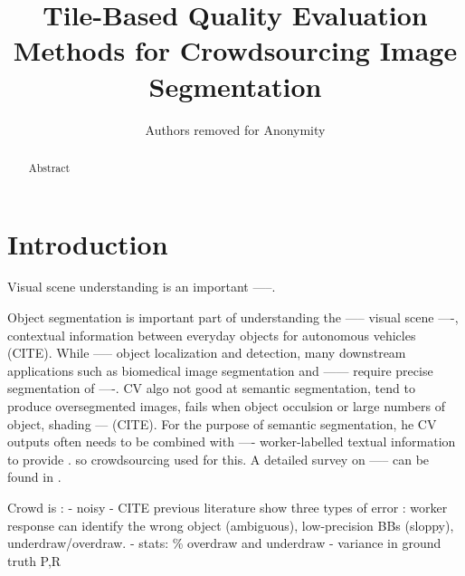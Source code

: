\documentclass[letterpaper]{article} %
\begin{document}

%
\title{Tile-Based Quality Evaluation Methods for Crowdsourcing Image Segmentation}
\author{Authors removed for Anonymity}
\maketitle
\begin{abstract}
Abstract
\end{abstract}

\section{Introduction}
Visual scene understanding is an important -----. 
\par Object segmentation is important part of understanding the ----- visual scene \cite{Lin2014} ----, contextual information between everyday objects for 
 autonomous vehicles (CITE). While ----- object localization and detection, many downstream applications such as biomedical image segmentation and ------ require precise segmentation of ----. CV algo not good at semantic segmentation, tend to produce oversegmented images, fails when object occulsion or large numbers of object, shading --- (CITE). For the purpose of semantic segmentation, he CV outputs often needs to be combined with ---- worker-labelled textual information to provide \cite{Russakovsky2015,Li2009,Bearman2016}.
so crowdsourcing used for this. 
A detailed survey on ----- can be found in \cite{Kovashka2016}.
\par Crowd is :
- noisy 
	- CITE previous literature show three types of error : worker response can identify the wrong object (ambiguous), low-precision BBs (sloppy), underdraw/overdraw. 
		- stats: \% overdraw and underdraw
		- variance in ground truth P,R 
\end{document}
